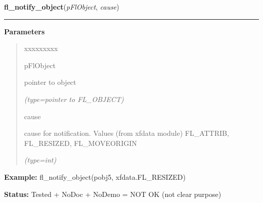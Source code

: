     \label{xformslib:flbasic:fl_notify_object}

    \vspace{0.5ex}

\hspace{.8\funcindent}\begin{boxedminipage}{\funcwidth}

    \raggedright \textbf{fl\_notify\_object}(\textit{pFlObject}, \textit{cause})

    \vspace{-1.5ex}

    \rule{\textwidth}{0.5\fboxrule}
\setlength{\parskip}{2ex}
\setlength{\parskip}{1ex}
      \textbf{Parameters}
      \vspace{-1ex}

      \begin{quote}
        \begin{Ventry}{xxxxxxxxx}

          \item[pFlObject]

          pointer to object

            {\it (type=pointer to FL\_OBJECT)}

          \item[cause]

          cause for notification. Values (from xfdata module) FL\_ATTRIB, 
          FL\_RESIZED, FL\_MOVEORIGIN

            {\it (type=int)}

        \end{Ventry}

      \end{quote}

\textbf{Example:} fl\_notify\_object(pobj5, xfdata.FL\_RESIZED)



\textbf{Status:} Tested + NoDoc + NoDemo = NOT OK (not clear purpose)



    \end{boxedminipage}

    \label{xformslib:flbasic:fl_set_object_lalign}

    \vspace{0.5ex}

